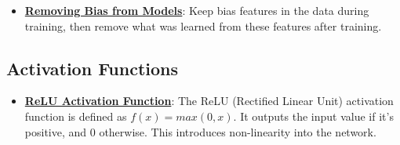 \documentclass{article}%
\begin{document}
\begin{itemize}[leftmargin=*]
\item \href{https://purdue.brightspace.com/d2l/common/assets/pdfjs-d2l-dist/1.0.14-legacy/web/viewer.html?file=\%2Fcontent\%2Fenforced\%2F1095467-wl.202510.CS.24300.001\%2F16L2-ethics.pdf\%3Fou\%3D1095467\&lang=en-us\&container=d2l-fileviewer-rendered-pdf\&fullscreen=d2l-fileviewer-rendered-pdf-dialog\&height=667#page=34}{\textbf{Removing Bias from Models}}: Keep bias features in the data during training, then remove what was learned from these features after training.%
\end{itemize}

%
\subsection{Activation Functions}%
\label{subsec:ActivationFunctions}%
\begin{itemize}[leftmargin=*]%
\item \href{https://purdue.brightspace.com/d2l/common/assets/pdfjs-d2l-dist/1.0.14-legacy/web/viewer.html?file=\%2Fcontent\%2Fenforced\%2F1095467-wl.202510.CS.24300.001\%2F09L1-cnn.pdf\%3Fou\%3D1095467\&lang=en-us\&container=d2l-fileviewer-rendered-pdf\&fullscreen=d2l-fileviewer-rendered-pdf-dialog\&height=667#page=13}{\textbf{ReLU Activation Function}}: The ReLU (Rectified Linear Unit) activation function is defined as $f(x) = max(0, x)$. It outputs the input value if it's positive, and 0 otherwise. This introduces non-linearity into the network.%
\end{itemize}

%
\end{document}
